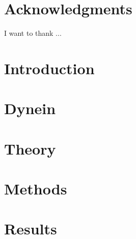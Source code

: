 \documentclass[12pt]{report}
\begin{document}
	\chapter*{Acknowledgments}
	I want to thank ...
	
	\tableofcontents
	
	\chapter{Introduction}
	
	\chapter{Dynein}
	
	\chapter{Theory}
	
	\chapter{Methods}
	
	\chapter{Results}
	


\end{document}
